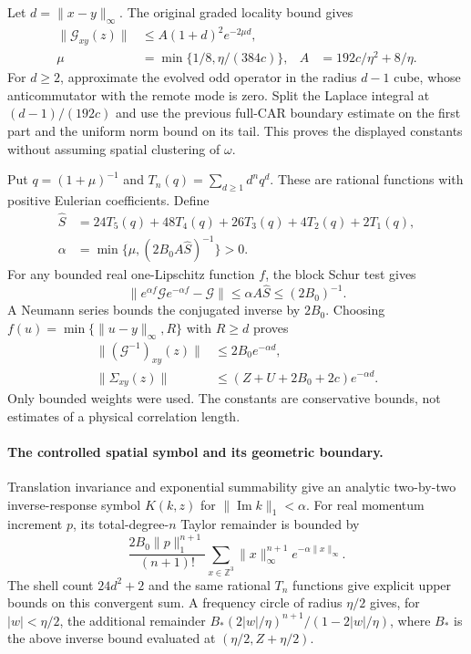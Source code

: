 Let $d=\|x-y\|_\infty$.  The original graded locality bound gives
\begin{align*}
 \|\mathcal G_{xy}(z)\|&\leq A(1+d)^2e^{-2\mu d},\\
 \mu&=\min\{1/8,\eta/(384c)\},
 &A&=192c/\eta^2+8/\eta.
\end{align*}
For $d\geq2$, approximate the evolved odd operator in the radius
$d-1$ cube, whose anticommutator with the remote mode is zero.
Split the Laplace integral at $(d-1)/(192c)$ and use the previous
full-CAR boundary estimate on the first part and the uniform norm bound
on its tail.  This proves the displayed constants without assuming
spatial clustering of $\omega$.

Put $q=(1+\mu)^{-1}$ and
$T_n(q)=\sum_{d\geq1}d^nq^d$.  These are rational functions with
positive Eulerian coefficients.  Define
\begin{align*}
 \widehat S&=24T_5(q)+48T_4(q)+26T_3(q)+4T_2(q)+2T_1(q),\\
 \alpha&=\min\{\mu,(2B_0A\widehat S)^{-1}\}>0.
\end{align*}
For any bounded real one-Lipschitz function $f$, the block Schur test gives
\[
 \|e^{\alpha f}\mathcal G e^{-\alpha f}-\mathcal G\|
       \leq\alpha A\widehat S\leq(2B_0)^{-1}.
\]
A Neumann series bounds the conjugated inverse by $2B_0$.
Choosing $f(u)=\min\{\|u-y\|_\infty,R\}$ with $R\geq d$ proves
\begin{align*}
 \|(\mathcal G^{-1})_{xy}(z)\|&\leq2B_0e^{-\alpha d},\\
 \|\Sigma_{xy}(z)\|&\leq(Z+U+2B_0+2c)e^{-\alpha d}.
\end{align*}
Only bounded weights were used.  The constants are conservative bounds,
not estimates of a physical correlation length.

\paragraph{The controlled spatial symbol and its geometric boundary.}
Translation invariance and exponential summability give an analytic
two-by-two inverse-response symbol $K(k,z)$ for
$\|\operatorname{Im}k\|_1<\alpha$.
For real momentum increment $p$, its total-degree-$n$ Taylor remainder
is bounded by
\[
 \frac{2B_0\|p\|_1^{n+1}}{(n+1)!}
 \sum_{x\in\mathbb Z^3}\|x\|_\infty^{n+1}
                       e^{-\alpha\|x\|_\infty}.
\]
The shell count $24d^2+2$ and the same rational $T_n$ functions give
explicit upper bounds on this convergent sum.  A frequency circle of
radius $\eta/2$ gives, for $|w|<\eta/2$, the additional remainder
$B_* (2|w|/\eta)^{n+1}/(1-2|w|/\eta)$, where $B_*$ is the above
inverse bound evaluated at $(\eta/2,Z+\eta/2)$.


